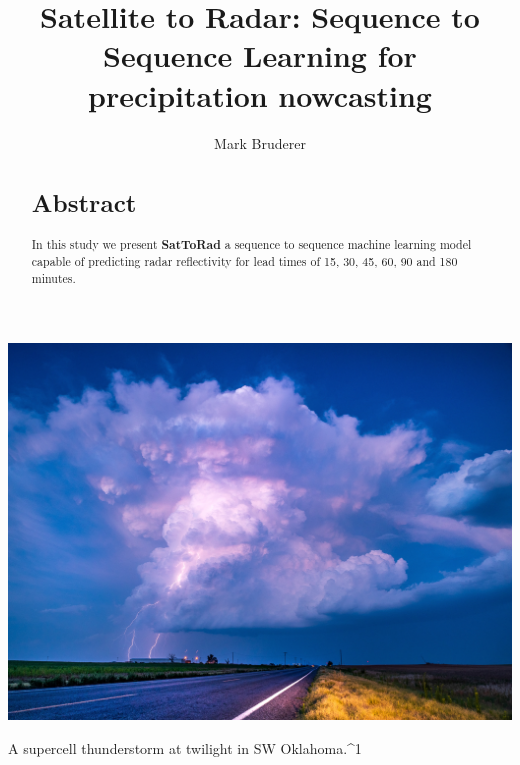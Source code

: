 \documentclass[acmtog, authorversion]{acmart}
\begin{document}
\title{Satellite to Radar: Sequence to Sequence Learning for precipitation nowcasting}

\author{Mark Bruderer}

\renewcommand{\shortauthors}{Mark Bruderer}

\begin{abstract}
\section*{Abstract}
In this study we present \textbf{SatToRad} a sequence to sequence machine learning model capable of predicting radar reflectivity for lead times of 15, 30, 45, 60, 90 and 180 minutes.
\end{abstract}



\begin{teaserfigure}
  \includegraphics*[width=\textwidth, trim= 0in 0.0in 0in 16.0in]{images/lightning.jpg}
  \caption{A supercell thunderstorm at twilight in SW Oklahoma.^1}
  \label{fig:teaser}
\end{teaserfigure}

\maketitle
\end{document}
